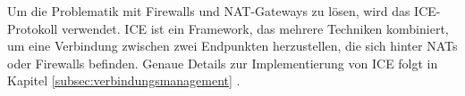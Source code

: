 Um die Problematik mit Firewalls und NAT-Gateways zu lösen, wird das ICE-Protokoll verwendet. ICE ist ein Framework, das mehrere Techniken kombiniert, um eine Verbindung zwischen zwei Endpunkten herzustellen, die sich hinter NATs oder Firewalls befinden. Genaue Details zur Implementierung von ICE folgt in Kapitel \ref{subsec:verbindungsmanagement} \textit{}.


